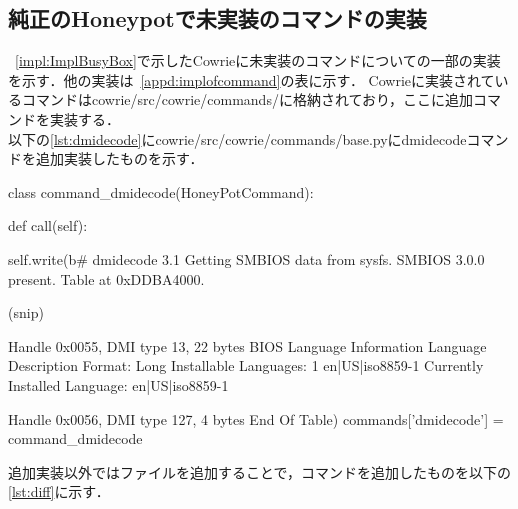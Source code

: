 \subsection{純正のHoneypotで未実装のコマンドの実装}
~\ref{impl:ImplBusyBox}で示したCowrieに未実装のコマンドについての一部の実装を示す．他の実装は~\ref{appd:implofcommand}の表に示す．
Cowrieに実装されているコマンドはcowrie/src/cowrie/commands/に格納されており，ここに追加コマンドを実装する．\\

以下の\ref{lst:dmidecode}にcowrie/src/cowrie/commands/base.pyにdmidecodeコマンドを追加実装したものを示す．\cite{dmidecode}

\vspace{3mm}
\begin{mylisting}[label={lst:dmidecode},language=sh,caption=dmidecode]
class command_dmidecode(HoneyPotCommand):

    def call(self):

        self.write(b# dmidecode 3.1
Getting SMBIOS data from sysfs.
SMBIOS 3.0.0 present.
Table at 0xDDBA4000.

(snip)

Handle 0x0055, DMI type 13, 22 bytes
BIOS Language Information
    Language Description Format: Long
    Installable Languages: 1
        en|US|iso8859-1
    Currently Installed Language: en|US|iso8859-1

Handle 0x0056, DMI type 127, 4 bytes
End Of Table\n)
commands['dmidecode'] = command_dmidecode
\end{mylisting}
\vspace{3mm}
追加実装以外ではファイルを追加することで，コマンドを追加したものを以下の\ref{lst:diff}に示す．\cite{diffcommand}
\vspace{3mm}
